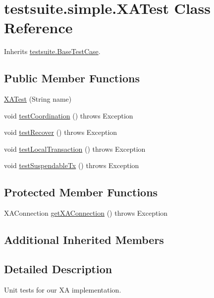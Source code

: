 \hypertarget{classtestsuite_1_1simple_1_1_x_a_test}{}\section{testsuite.\+simple.\+X\+A\+Test Class Reference}
\label{classtestsuite_1_1simple_1_1_x_a_test}


Inherits \mbox{\hyperlink{classtestsuite_1_1_base_test_case}{testsuite.\+Base\+Test\+Case}}.

\subsection*{Public Member Functions}
\begin{DoxyCompactItemize}
\item 
\mbox{\hyperlink{classtestsuite_1_1simple_1_1_x_a_test_ab9bf087db2550571c63bb6f3d8dc31d9}{X\+A\+Test}} (String name)
\item 
void \mbox{\hyperlink{classtestsuite_1_1simple_1_1_x_a_test_ac5d7e1565f556c03ca6ba2a11a6de5fa}{test\+Coordination}} ()  throws Exception 
\item 
void \mbox{\hyperlink{classtestsuite_1_1simple_1_1_x_a_test_aa3b48d0aaeb44cc191cba70d70e16234}{test\+Recover}} ()  throws Exception 
\item 
void \mbox{\hyperlink{classtestsuite_1_1simple_1_1_x_a_test_aeb2dc398d807c4028e784f85aba58457}{test\+Local\+Transaction}} ()  throws Exception 
\item 
void \mbox{\hyperlink{classtestsuite_1_1simple_1_1_x_a_test_a81909386fefd2283e02aa376525f6fd7}{test\+Suspendable\+Tx}} ()  throws Exception 
\end{DoxyCompactItemize}
\subsection*{Protected Member Functions}
\begin{DoxyCompactItemize}
\item 
X\+A\+Connection \mbox{\hyperlink{classtestsuite_1_1simple_1_1_x_a_test_ad6e5c8d3fc2f2bff1cbb0712db804ca8}{get\+X\+A\+Connection}} ()  throws Exception 
\end{DoxyCompactItemize}
\subsection*{Additional Inherited Members}


\subsection{Detailed Description}
Unit tests for our XA implementation. 

